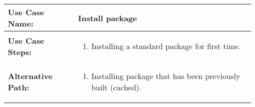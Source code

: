 \medskip

\begin{tabularx}{\linewidth}{|l|X|}
\hline
\textbf{Use Case Name:} & \textbf{Install package} \\
\hline
\textbf{Use Case Steps:} & 
\begin{minipage}{\linewidth} 
  \vspace{0.05em}
  \begin{enumerate}
   \item Installing a standard package for first time.
  \end{enumerate}
  \vspace{0.05em}
\end{minipage}
\\
\hline 
\textbf{Alternative Path:} &
\begin{minipage}{\linewidth}
  \vspace{0.05em} 
  \begin{enumerate}
    \item Installing package that has been previously built (cached).
  \end{enumerate}
  \vspace{0.05em} 
\end{minipage}
\\
\hline
\end{tabularx}

\newpage


